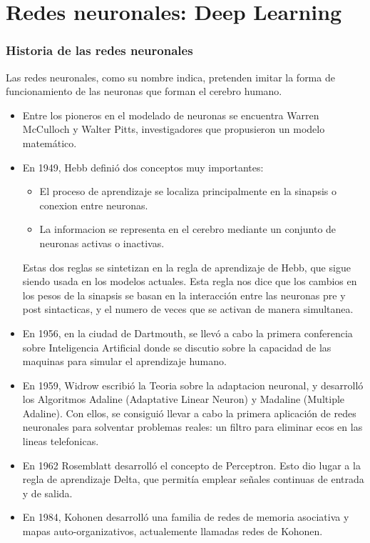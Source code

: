 \chapter{Redes neuronales: Deep Learning}
\subsection {Historia de las redes neuronales}
Las redes neuronales, como su nombre indica, pretenden imitar la forma de funcionamiento de las neuronas que forman el cerebro humano. 
\begin{itemize}
\item Entre los pioneros en el modelado de neuronas se encuentra Warren McCulloch y Walter Pitts, investigadores que propusieron un modelo matemático.
\item En 1949, Hebb definió dos conceptos muy importantes:
\begin{itemize}
\item El proceso de aprendizaje se localiza principalmente en la sinapsis o conexion entre neuronas.
\item La informacion se representa en el cerebro mediante un conjunto de neuronas activas o inactivas.
\end{itemize}
Estas dos reglas se sintetizan en la regla de aprendizaje de Hebb, que sigue siendo usada en los modelos actuales. Esta regla nos dice que los cambios en los pesos de la sinapsis se basan en la interacción entre las neuronas pre y post sintacticas, y el numero de veces que se activan de manera simultanea.
\item En 1956, en la ciudad de Dartmouth, se llevó a cabo la primera conferencia sobre Inteligencia Artificial donde se discutio sobre la capacidad de las maquinas para simular el aprendizaje humano.
\item En 1959, Widrow escribió la Teoria sobre la adaptacion neuronal, y desarrolló los Algoritmos Adaline (Adaptative Linear Neuron) y Madaline (Multiple Adaline). Con ellos, se consiguió llevar a cabo la primera aplicación de redes neuronales para solventar problemas reales: un filtro para eliminar ecos en las lineas telefonicas.
\item En 1962 Rosemblatt desarrolló el concepto de Perceptron. Esto dio lugar a la regla de aprendizaje Delta, que permitía emplear señales continuas de entrada y de salida. 
\item En 1984, Kohonen desarrolló una familia de redes de memoria asociativa y mapas auto-organizativos, actualemente llamadas redes de Kohonen.

\end{itemize}
